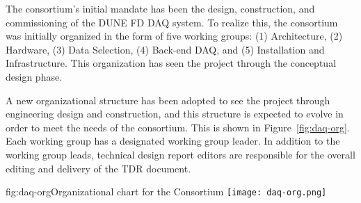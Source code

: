 The consortium's initial mandate has been the design, construction,
and commissioning 
of the DUNE FD DAQ system. To realize this, the consortium was
initially organized in the form of five working groups: (1)
Architecture, (2) Hardware, (3) Data Selection, (4) Back-end DAQ, and (5)
Installation and Infrastructure. This organization has seen the
project through the conceptual design phase.  

A new organizational
structure has been adopted to see the project through engineering
design and construction, and this structure is expected to evolve in
order to meet the needs of the consortium. This is shown in Figure~\ref{fig:daq-org}. Each working group has a designated working group
leader. In addition to the
working group leads, technical design report editors are responsible for the
overall editing and delivery of the TDR document.

\begin{dunefigure}{fig:daq-org}{Organizational chart for the  Consortium
 }
  \texttt{[image: daq-org.png]}
\end{dunefigure}

